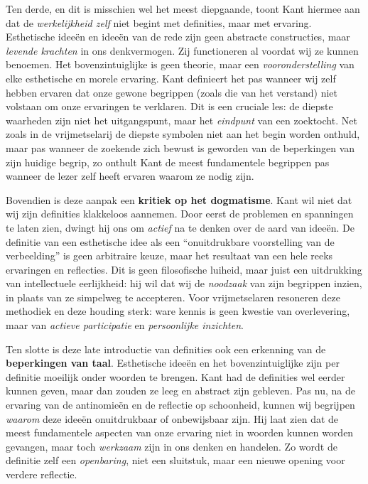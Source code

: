 \begin{mdframed}[leftmargin=0pt,rightmargin=0pt,backgroundcolor=blue!6,linecolor=white,innertopmargin=6pt,innerbottommargin=6pt]
Ten derde, en dit is misschien wel het meest diepgaande, toont Kant hiermee aan dat de \textit{werkelijkheid zelf} niet begint met definities, maar met ervaring. Esthetische ideeën en ideeën van de rede zijn geen abstracte constructies, maar \textit{levende krachten} in ons denkvermogen. Zij functioneren al voordat wij ze kunnen benoemen. Het bovenzintuiglijke is geen theorie, maar een \textit{vooronderstelling} van elke esthetische en morele ervaring. Kant definieert het pas wanneer wij zelf hebben ervaren dat onze gewone begrippen (zoals die van het verstand) niet volstaan om onze ervaringen te verklaren. Dit is een cruciale les: de diepste waarheden zijn niet het uitgangspunt, maar het \textit{eindpunt} van een zoektocht. Net zoals in de vrijmetselarij de diepste symbolen niet aan het begin worden onthuld, maar pas wanneer de zoekende zich bewust is geworden van de beperkingen van zijn huidige begrip, zo onthult Kant de meest fundamentele begrippen pas wanneer de lezer zelf heeft ervaren waarom ze nodig zijn.

Bovendien is deze aanpak een \textbf{kritiek op het dogmatisme}. Kant wil niet dat wij zijn definities klakkeloos aannemen. Door eerst de problemen en spanningen te laten zien, dwingt hij ons om \textit{actief} na te denken over de aard van ideeën. De definitie van een esthetische idee als een ``onuitdrukbare voorstelling van de verbeelding'' is geen arbitraire keuze, maar het resultaat van een hele reeks ervaringen en reflecties. Dit is geen filosofische luiheid, maar juist een uitdrukking van intellectuele eerlijkheid: hij wil dat wij de \textit{noodzaak} van zijn begrippen inzien, in plaats van ze simpelweg te accepteren. Voor vrijmetselaren resoneren deze methodiek en deze houding sterk: ware kennis is geen kwestie van overlevering, maar van \textit{actieve participatie} en \textit{persoonlijke inzichten}.

Ten slotte is deze late introductie van definities ook een erkenning van de \textbf{beperkingen van taal}. Esthetische ideeën en het bovenzintuiglijke zijn per definitie moeilijk onder woorden te brengen. Kant had de definities wel eerder kunnen geven, maar dan zouden ze leeg en abstract zijn gebleven. Pas nu, na de ervaring van de antinomieën en de reflectie op schoonheid, kunnen wij begrijpen \textit{waarom} deze ideeën onuitdrukbaar of onbewijsbaar zijn. Hij laat zien dat de meest fundamentele aspecten van onze ervaring niet in woorden kunnen worden gevangen, maar toch \textit{werkzaam} zijn in ons denken en handelen. Zo wordt de definitie zelf een \textit{openbaring}, niet een sluitstuk, maar een nieuwe opening voor verdere reflectie.


\end{mdframed}
